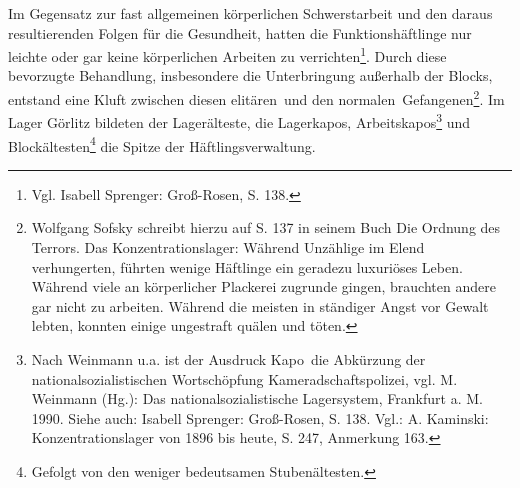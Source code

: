 \documentclass[a4paper,12pt,ngerman,
]{nisebook}
\begin{document}
Im Gegensatz zur fast allgemeinen körperlichen Schwerstarbeit und den daraus resultierenden Folgen für die Gesundheit, hatten die Funktionshäftlinge nur leichte oder gar keine körperlichen Arbeiten zu verrichten\footnote{Vgl. Isabell Sprenger: Groß-Rosen, S. 138.}. Durch diese bevorzugte Behandlung, insbesondere die Unterbringung außerhalb der Blocks, entstand eine Kluft zwischen diesen \glqq elitären\grqq~und den \glqq normalen\grqq~Gefangenen\footnote{Wolfgang Sofsky schreibt hierzu auf S. 137 in seinem Buch \glqq Die Ordnung des Terrors. Das Konzentrationslager\grqq: Während Unzählige im Elend verhungerten, führten wenige Häftlinge ein geradezu luxuriöses Leben. Während viele an körperlicher Plackerei zugrunde gingen, brauchten andere gar nicht zu arbeiten. Während die meisten in ständiger Angst vor Gewalt lebten, konnten einige ungestraft quälen und töten.}.\newline
Im Lager Görlitz bildeten der Lagerälteste, die Lagerkapos, Arbeitskapos\footnote{Nach Weinmann u.a. ist der Ausdruck \glqq Kapo\grqq~die Abkürzung der nationalsozialistischen Wortschöpfung \glqq Kameradschaftspolizei\grqq, vgl. M. Weinmann (Hg.): Das nationalsozialistische Lagersystem, Frankfurt a. M. 1990. Siehe auch: Isabell Sprenger: Groß-Rosen, S. 138. Vgl.: A. Kaminski: Konzentrationslager von 1896 bis heute, S. 247, Anmerkung 163.} und Blockältesten\footnote{Gefolgt von den weniger bedeutsamen Stubenältesten.} die Spitze der Häftlingsverwaltung.
\end{document}
